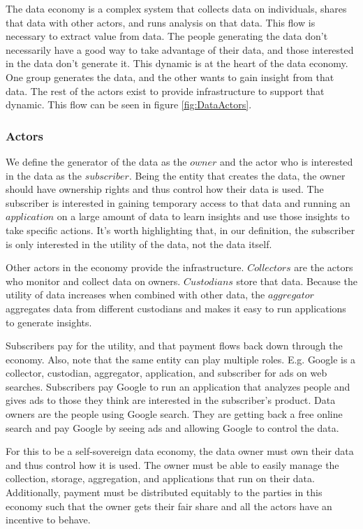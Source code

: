 The data economy is a complex system that collects data on individuals, shares that data with other actors, and runs analysis on that data. This flow is necessary to extract value from data. The people generating the data don't necessarily have a good way to take advantage of their data, and those interested in the data don't generate it. This dynamic is at the heart of the data economy. One group generates the data, and the other wants to gain insight from that data. The rest of the actors exist to provide infrastructure to support that dynamic. This flow can be seen in figure \ref{fig:DataActors}.


\subsubsection{Actors}
We define the generator of the data as the $\mathit{owner}$ and the actor who is interested in the data as the $\mathit{subscriber}$. Being the entity that creates the data, the owner should have ownership rights and thus control how their data is used. The subscriber is interested in gaining temporary access to that data and running an $\mathit{application}$ on a large amount of data to learn insights and use those insights to take specific actions. It's worth highlighting that, in our definition, the subscriber is only interested in the utility of the data, not the data itself.


Other actors in the economy provide the infrastructure. $\mathit{Collectors}$ are the actors who monitor and collect data on owners. $\mathit{Custodians}$ store that data. Because the utility of data increases when combined with other data, the $\mathit{aggregator}$ aggregates data from different custodians and makes it easy to run applications to generate insights.


Subscribers pay for the utility, and that payment flows back down through the economy. Also, note that the same entity can play multiple roles. E.g. Google is a collector, custodian, aggregator, application, and subscriber for ads on web searches. Subscribers pay Google to run an application that analyzes people and gives ads to those they think are interested in the subscriber's product. Data owners are the people using Google search. They are getting back a free online search and pay Google by seeing ads and allowing Google to control the data.


For this to be a self-sovereign data economy, the data owner must own their data and thus control how it is used. The owner must be able to easily manage the collection, storage, aggregation, and applications that run on their data. Additionally, payment must be distributed equitably to the parties in this economy such that the owner gets their fair share and all the actors have an incentive to behave.

